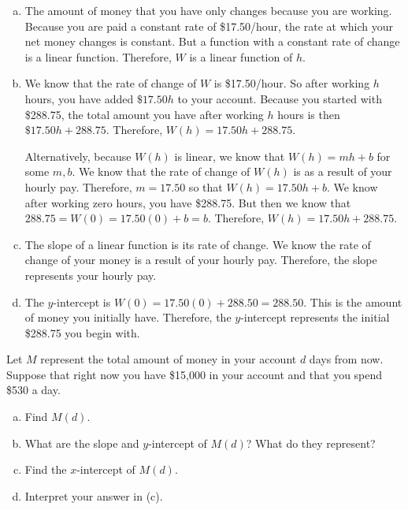 \documentclass[11pt,letterpaper]{article}
\begin{document}
\sol 
\begin{enumerate}[(a)]
\item The amount of money that you have only changes because you are working. Because you are paid a constant rate of \$17.50/hour, the rate at which your net money changes is constant. But a function with a constant rate of change is a linear function. Therefore, $W$ is a linear function of $h$. \pspace

\item We know that the rate of change of $W$ is \$17.50/hour. So after working $h$ hours, you have added $\$17.50h$ to your account. Because you started with \$288.75, the total amount you have after working $h$ hours is then $\$17.50h + 288.75$. Therefore, $W(h)= 17.50h + 288.75$. \pspace

Alternatively, because $W(h)$ is linear, we know that $W(h)= mh + b$ for some $m, b$. We know that the rate of change of $W(h)$ is as a result of your hourly pay. Therefore, $m= 17.50$ so that $W(h)= 17.50h + b$. We know after working zero hours, you have \$288.75. But then we know that $288.75= W(0)= 17.50(0) + b= b$. Therefore, $W(h)= 17.50h + 288.75$. \pspace

\item The slope of a linear function is its rate of change. We know the rate of change of your money is a result of your hourly pay. Therefore, the slope represents your hourly pay. \pspace

\item The $y$-intercept is $W(0)= 17.50(0) + 288.50= 288.50$. This is the amount of money you initially have. Therefore, the $y$-intercept represents the initial \$288.75 you begin with. 
\end{enumerate}



\newpage



 Let $M$ represent the total amount of money in your account $d$ days from now. Suppose that right now you have \$15,000 in your account and that you spend \$530 a day.
	\begin{enumerate}[(a)]
	\item Find $M(d)$.
	\item What are the slope and $y$-intercept of $M(d)$? What do they represent?
	\item Find the $x$-intercept of $M(d)$.
	\item Interpret your answer in (c). 
	\end{enumerate} \pspace
\end{document}
